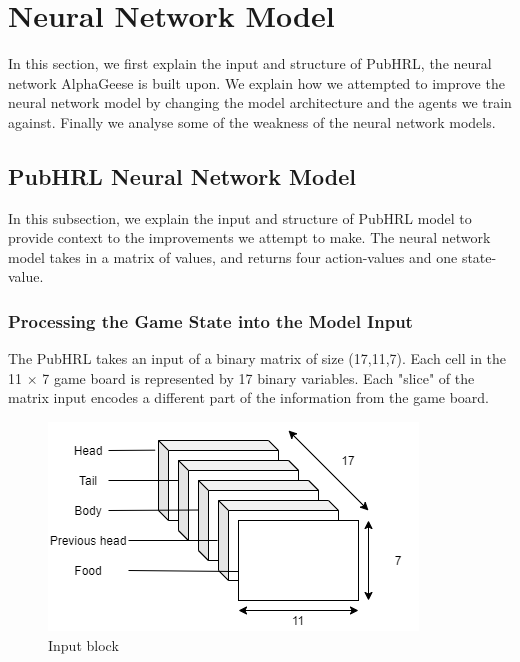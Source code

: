 \section{Neural Network Model}
\label{section_nn_model}

In this section, we first explain the input and structure of PubHRL, the neural network AlphaGeese is built upon. We explain how we attempted to improve the neural network model by changing the model architecture and the agents we train against. Finally we analyse some of the weakness of the neural network models.

\subsection{PubHRL Neural Network Model}
\label{section_pubhrl}

In this subsection, we explain the input and structure of PubHRL model \cite{notebook_pubhrl} to provide context to the improvements we attempt to make. The neural network model takes in a matrix of values, and returns four action-values and one state-value.

\subsubsection{Processing the Game State into the Model Input}
\label{subsection_pubhrl_input}

The PubHRL takes an input of a binary matrix of size (17,11,7). Each cell in the 11 $\times$ 7 game board is represented by 17 binary variables. Each "slice" of the matrix input encodes a different part of the information from the game board.

\begin{figure}[hb!]
\centering
  \includegraphics[width=0.6\linewidth]{images/input.png}
  \caption{Input block}
\end{figure}

